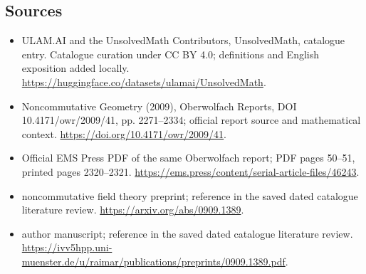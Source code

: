 \documentclass[11pt]{article}
\begin{document}
\subsection{Sources}
\begin{itemize}
\item[\hypertarget{source:statement:1}{S1}] ULAM.AI and the UnsolvedMath Contributors, UnsolvedMath, catalogue entry. Catalogue curation under CC BY 4.0; definitions and English exposition added locally.
\url{https://huggingface.co/datasets/ulamai/UnsolvedMath}.
\item[\hypertarget{source:statement:2}{S2}] Noncommutative Geometry (2009), Oberwolfach Reports, DOI 10.4171/owr/2009/41, pp. 2271--2334; official report source and mathematical context.
\url{https://doi.org/10.4171/owr/2009/41}.
\item[\hypertarget{source:statement:3}{S3}] Official EMS Press PDF of the same Oberwolfach report; PDF pages 50--51, printed pages 2320--2321.
\url{https://ems.press/content/serial-article-files/46243}.
\item[\hypertarget{source:statement:4}{S4}] noncommutative field theory preprint; reference in the saved dated catalogue literature review.
\url{https://arxiv.org/abs/0909.1389}.
\item[\hypertarget{source:statement:5}{S5}] author manuscript; reference in the saved dated catalogue literature review.
\url{https://ivv5hpp.uni-muenster.de/u/raimar/publications/preprints/0909.1389.pdf}.
\end{itemize}
\label{end:statement}
\end{document}
